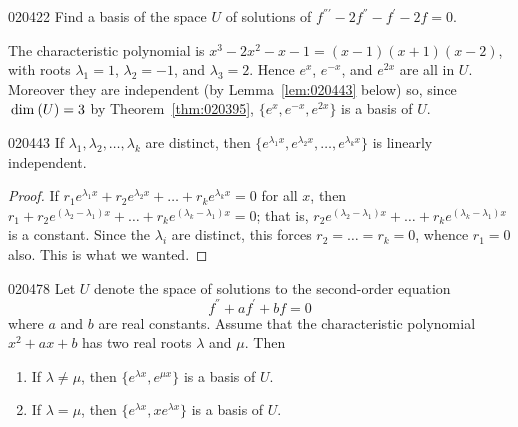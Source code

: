 \begin{example}{}{020422}
Find a basis of the space $U$ of solutions of $f^{\dprime\prime} - 2f^\dprime - f^\prime - 2f = 0$.

\begin{solution}
The characteristic polynomial is $x^{3} - 2x^{2} - x - 1 = (x - 1)(x + 1)(x - 2)$, with roots $\lambda_{1} = 1$, $\lambda_{2} = -1$, and $\lambda_{3} = 2$. Hence $e^{x}$, $e^{-x}$, and $e^{2x}$ are all in $U$. Moreover they are independent (by Lemma~\ref{lem:020443} below) so, since $\thinspace\operatorname{dim\medspace}(U) = 3$ by Theorem~\ref{thm:020395}, $\{e^{x}, e^{-x}, e^{2x}\}$ is a basis of $U$.
\end{solution}
\end{example}

\begin{lemma}{}{020443}
If $\lambda_{1}, \lambda_{2}, \dots, \lambda_{k}$ are distinct, then $\{e^{\lambda_1 x}, e^{\lambda_2 x}, \dots, e^{\lambda_k x}\}$ is linearly independent.
\end{lemma}

\begin{proof}
If $r_1e^{\lambda_1 x} + r_2e^{\lambda_2 x} + \dots + r_ke^{\lambda_k x} = 0$ for all $x$, then $r_1 + r_2e^{(\lambda_2 - \lambda_1)x} + \dots + r_ke^{(\lambda_k - \lambda_1)x} = 0$; that is,
$r_2e^{(\lambda_2 - \lambda_1)x} + \dots + r_ke^{(\lambda_k - \lambda_1)x}$ is a constant. Since the $\lambda_i$ are distinct, this forces $r_2 = \dots = r_k = 0$,  whence $r_1 = 0$ also. This is what we wanted.
\end{proof}

\begin{theorem}{}{020478}
Let $U$ denote the space of solutions to the second-order equation
\begin{equation*}
f^\dprime + af^\prime + bf = 0
\end{equation*}
where $a$ and $b$ are real constants. Assume that the characteristic polynomial $x^{2} + ax + b$ has two real roots $\lambda$ and $\mu$. Then

\begin{enumerate}
\item If $\lambda \neq \mu$, then $\{e^{\lambda x}, e^{\mu x}\}$ is a basis of $U$.

\item If $\lambda = \mu$, then $\{e^{\lambda x}, xe^{\lambda x}\}$ is a basis of $U$.

\end{enumerate}
\end{theorem}

